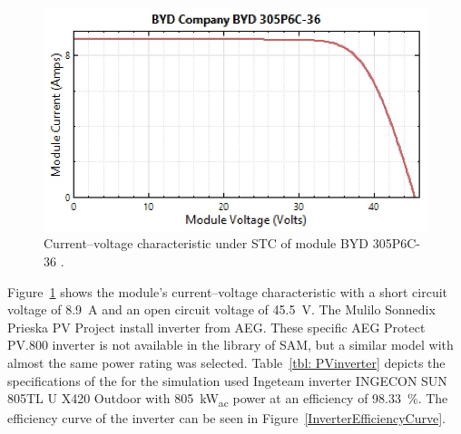 \begin{figure}[htbp]  
\centering
\includegraphics[width=0.70\linewidth]{FIG/PVModuleVA}
\caption[Current–voltage characteristic under STC of module BYD 305P6C-36.]{Current–voltage characteristic under STC of module BYD 305P6C-36 \cite{NREL2015g}.}\label{PVModuleVA}
\end{figure}


Figure~\ref{PVModuleVA} shows the module’s current–voltage characteristic with a short circuit voltage of 8.9~A and an open circuit voltage of 45.5~V.\newpage\noindent
The Mulilo Sonnedix Prieska PV Project install inverter from AEG. These specific AEG Protect PV.800 inverter is not available in the library of SAM, but a similar model with almost the same power rating was selected. Table~\ref{tbl: PVinverter} depicts the specifications of the for the simulation used Ingeteam inverter INGECON SUN 805TL U X420 Outdoor with 805~kW\textsubscript{ac} power at an efficiency of 98.33~\%. The efficiency curve of the inverter can be seen in Figure~\ref{InverterEfficiencyCurve}. 

